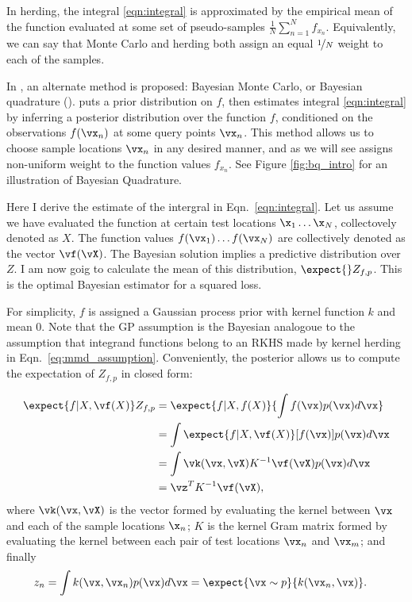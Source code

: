 In herding, the integral \eqref{eqn:integral} is approximated by the empirical mean of the function evaluated at some set of pseudo-samples $\frac{1}{N}\sum_{n=1}^{N}f_{x_n}$. Equivalently, we can say that Monte Carlo and herding both assign an equal $\nicefrac{1}{N}$ weight to each of the samples.

In \citep{BZMonteCarlo}, an alternate method is proposed: Bayesian Monte Carlo, or Bayesian quadrature (\bq). \bq{} puts a prior distribution on $f$, then estimates integral \eqref{eqn:integral} by inferring a posterior distribution over the function $f$, conditioned on the observations $f(\vx_n)$ at some query points $\vx_n$. This method allows us to choose sample locations $\vx_n$ in any desired manner, and as we will see assigns non-uniform weight to the function values $f_{x_n}$. See Figure \ref{fig:bq_intro} for an illustration of Bayesian Quadrature.

Here I derive the \bq{} estimate of the intergral in Eqn.\ \eqref{eqn:integral}. Let us assume we have evaluated the function at certain test locations $\x_1 \ldots \x_N$, collectovely denoted as $X$. The function values $f(\vx_1) \ldots f(\vx_N)$ are collectively denoted as the vector $\vf(\vX)$. The Bayesian solution implies a predictive distribution over $Z$. I am now goig to calculate the mean of this distribution, $\expect{}Z_{f,p}$. This is the optimal Bayesian estimator for a squared loss.

For simplicity, $f$ is assigned a Gaussian process prior with kernel function $k$ and mean $0$.  Note that the GP assumption is the Bayesian analogoue to the assumption that integrand functions belong to an RKHS made by kernel herding in Eqn.\ \eqref{eq:mmd_assumption}. Conveniently, the \gp{} posterior allows us to compute the expectation of $Z_{f,p}$ in closed form: 

\begin{align}
	\expect{f\vert X,\vf(X)} Z_{f,p}  &= \expect{f\vert X,f(X)}{\int f(\vx)p(\vx)d\vx}\\
	 & = \int \expect{f\vert X,\vf(X)}[f(\vx)] p(\vx) d\vx\\
	 & = \int \vk(\vx, \vX) K^{-1} \vf(\vX) p(\vx) d\vx \\
	 & = \vz^T K^{-1} \vf(\vX),
	\label{eq:marg_mean_symbolic}
\end{align} 
where $\vk(\vx, \vX)$ is the vector formed by evaluating the kernel between $\vx$ and each of the sample locations $\x_n$; $K$ is the kernel Gram matrix formed by evaluating the kernel between each pair of test locations $\vx_n$ and $\vx_m$; and finally
\begin{align}
z_n & = \int k(\vx, \vx_n) p(\vx) d\vx = \expect{\vx \sim p}{k(\vx_n, \vx)}.
\end{align}

